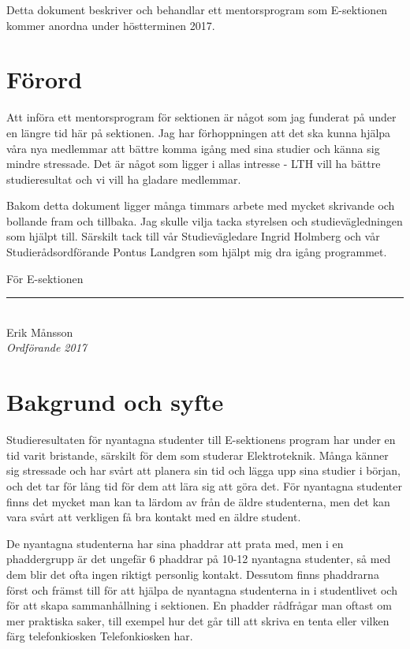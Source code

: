 \documentclass[10pt]{article}
\def\year{2017}
\def\doctitle{E-sektionens mentorsprogram \year}
\begin{document}
    \heading{\doctitle}

    Detta dokument beskriver och behandlar ett mentorsprogram som E-sektionen kommer anordna under höstterminen \year.

    \tableofcontents

    \newpage

    \section{Förord}
    Att införa ett mentorsprogram för sektionen är något som jag funderat på under en längre tid här på sektionen.
    Jag har förhoppningen att det ska kunna hjälpa våra nya medlemmar att bättre komma igång med sina studier och känna sig mindre stressade.
    Det är något som ligger i allas intresse - LTH vill ha bättre studieresultat och vi vill ha gladare medlemmar.

    Bakom detta dokument ligger många timmars arbete med mycket skrivande och bollande fram och tillbaka.
    Jag skulle vilja tacka styrelsen och studievägledningen som hjälpt till.
    Särskilt tack till vår Studievägledare Ingrid Holmberg och vår Studierådsordförande Pontus Landgren som hjälpt mig dra igång programmet.

    \vspace*{1\baselineskip}
    För E-sektionen
    \vspace*{1.5cm}
    \par
    \parbox{5.8cm}{
        \rule{5.0cm}{0.4pt}\\
        Erik Månsson\\
        \emph{Ordförande 2017}
    }

    \newpage

    \section{Bakgrund och syfte}
    Studieresultaten för nyantagna studenter till E-sektionens program har under en tid varit bristande, särskilt för dem som studerar Elektroteknik.
    Många känner sig stressade och har svårt att planera sin tid och lägga upp sina studier i början, och det tar för lång tid för dem att lära sig att göra det.
    För nyantagna studenter finns det mycket man kan ta lärdom av från de äldre studenterna, men det kan vara svårt att verkligen få bra kontakt med en äldre student.

    De nyantagna studenterna har sina phaddrar att prata med, men i en phaddergrupp är det ungefär 6 phaddrar på 10-12 nyantagna studenter, så med dem blir det ofta ingen riktigt personlig kontakt.
    Dessutom finns phaddrarna först och främst till för att hjälpa de nyantagna studenterna in i studentlivet och för att skapa sammanhållning i sektionen.
    En phadder rådfrågar man oftast om mer praktiska saker, till exempel hur det går till att skriva en tenta eller vilken färg telefonkiosken Telefonkiosken har.
\end{document}
